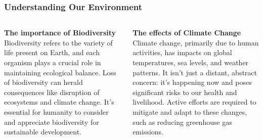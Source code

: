 \documentclass[5pt]{beamer}
\begin{document}
\begin{frame}
\frametitle{Understanding Our Environment}
\begin{columns}
\begin{column}{0.45\textwidth}
\begin{block}{\textbf{The importance of Biodiversity}}
Biodiversity refers to the variety of life present on Earth, and each organism plays a crucial role in maintaining ecological balance. Loss of biodiversity can herald consequences like disruption of ecosystems and climate change. It's essential for humanity to consider and appreciate biodiversity for sustainable development.
\end{block}
\end{column}
\begin{column}{0.45\textwidth}
\begin{block}{\textbf{The effects of Climate Change}}
Climate change, primarily due to human activities, has impacts on global temperatures, sea levels, and weather patterns. It isn't just a distant, abstract concern: it's happening now and poses significant risks to our health and livelihood. Active efforts are required to mitigate and adapt to these changes, such as reducing greenhouse gas emissions.
\end{block}
\end{column}
\end{columns}
\end{frame}
\end{document}
